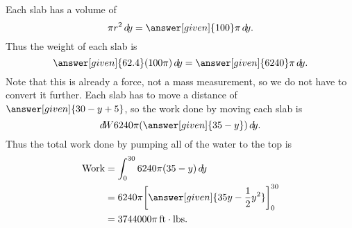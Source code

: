 \documentclass{ximera}
\begin{document}
\begin{example}
\begin{explanation}
\begin{image}
    \end{image}
    Each slab has a volume of
    \[
    \pi r^2 \d y = \answer[given]{100}\pi\d y.
    \]
    Thus the weight of each slab is
    \[
    \answer[given]{62.4}(100\pi)\d y = \answer[given]{6240}\pi \d y.
    \]
    Note that this is already a force, not a mass measurement, so we
    do not have to convert it further.  Each slab has to move a
    distance of $\answer[given]{30-y +5}$, so the work done by moving
    each slab is
          \[
          \d W 6240 \pi (\answer[given]{35-y}) \d y.
          \]
          Thus the total work done by pumping all of the water to the top is
          \begin{align*}
	    \text{Work} &= \int_0^{30} 6240 \pi (35-y) \d y\\
	    &= 6240 \pi \eval{\answer[given]{35y-\frac{1}{2}y^2}}_0^{30}\\
	    &=  3744000 \pi \unit{ft}\cdot\unit{lbs}.
          \end{align*}
  \end{explanation}
\end{example}
\end{document}
